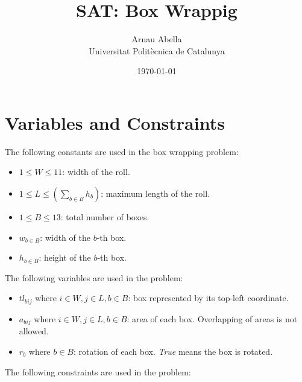 \documentclass[12pt, a4paper]{article} %
\title{%
  SAT: Box Wrappig
}
\author{%
  Arnau Abella \\
  \large{Universitat Polit\`ecnica de Catalunya}
}
\date{\today}
\begin{document}
\maketitle


\section{Variables and Constraints}%
\label{sec:Variables and Clauses}

The following constants are used in the box wrapping problem:

\begin{itemize}
  \item $1 \leq W \leq 11$: width of the roll.
  \item $1 \leq L \leq (\sum_{b \in B} h_b)$: maximum length of the roll.
  \item $1 \leq B \leq 13$: total number of boxes.
  \item $w_{b \in B}$: width of the $b$-th box.
  \item $h_{b \in B}$: height of the $b$-th box.
\end{itemize}

The following variables are used in the problem:

\begin{itemize}
  \item $tl_{bij}$ where $i \in W, j \in L, b \in B$: box represented by its top-left coordinate.
  \item $a_{bij}$ where $i \in W, j \in L, b \in B$: area of each box. Overlapping of areas is not allowed.
  \item $r_b$ where $b \in B$: rotation of each box. \textit{True} means the box is rotated.
\end{itemize}

The following constraints are used in the problem:
\end{document}
